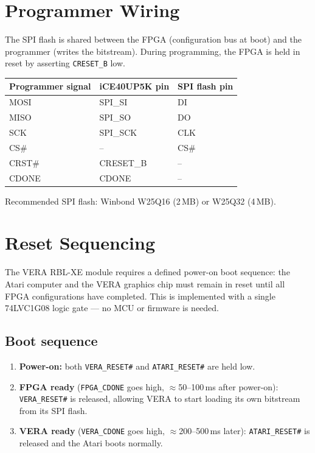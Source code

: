 \documentclass[11pt,a4paper]{article}
\newcommand{\sig}[1]{\texttt{#1}}
\begin{document}
\section{Programmer Wiring}

The SPI flash is shared between the FPGA (configuration bus at boot)
and the programmer (writes the bitstream).  During programming, the
FPGA is held in reset by asserting \sig{CRESET\_B} low.

\begin{center}
\begin{tabular}{lll}
\toprule
\textbf{Programmer signal} & \textbf{iCE40UP5K pin} & \textbf{SPI flash pin} \\
\midrule
MOSI  & SPI\_SI   & DI  \\
MISO  & SPI\_SO   & DO  \\
SCK   & SPI\_SCK  & CLK \\
CS\#  & --        & CS\# \\
CRST\# & CRESET\_B & -- \\
CDONE & CDONE     & -- \\
\bottomrule
\end{tabular}
\end{center}

Recommended SPI flash: Winbond W25Q16 (2\,MB) or W25Q32 (4\,MB).

\section{Reset Sequencing}
\label{sec:reset}

The VERA RBL-XE module requires a defined power-on boot sequence: the
Atari computer and the VERA graphics chip must remain in reset until all
FPGA configurations have completed.  This is implemented with a single
74LVC1G08 logic gate --- no MCU or firmware is needed.

\subsection{Boot sequence}

\begin{enumerate}[noitemsep]
    \item \textbf{Power-on:} both \sig{VERA\_RESET\#} and
          \sig{ATARI\_RESET\#} are held low.
    \item \textbf{FPGA ready} (\sig{FPGA\_CDONE} goes high,
          $\approx$50--100\,ms after power-on): \sig{VERA\_RESET\#} is
          released, allowing VERA to start loading its own bitstream
          from its SPI flash.
    \item \textbf{VERA ready} (\sig{VERA\_CDONE} goes high,
          $\approx$200--500\,ms later): \sig{ATARI\_RESET\#} is released
          and the Atari boots normally.
\end{enumerate}
\end{document}
